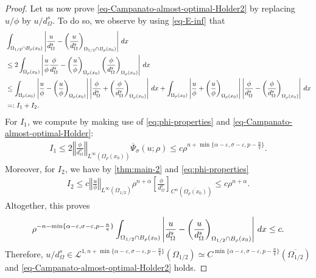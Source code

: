 \documentclass[11pt,reqno]{amsart}
\theoremstyle{plain}
\theoremstyle{definition}
\numberwithin{equation}{section}
\newcommand{\1}{\mathbbm{1}}
\renewcommand{\d}{\textnormal{\,d}}
\begin{document}
\begin{proof}
Let us now prove \eqref{eq-Campanato-almost-optimal-Holder2} by replacing $u/\phi$ by $u/d_{\Omega}^s$. To do so, we observe by using \eqref{eq-E-inf} that
\begin{align}
\label{eq:Campanato-product}
\begin{split}
&\int_{\Omega_{1/2} \cap B_\rho(x_0)} \left| \frac{u}{d^s_{\Omega}} - \left( \frac{u}{d^s_{\Omega}} \right)_{\Omega_{1/2} \cap B_{\rho}(x_0)} \right| \d x \\
&\le 2\int_{\Omega_\rho(x_0)} \left| \frac{u}{\phi}\frac{\phi}{d^s_{\Omega}} - \left( \frac{u}{\phi} \right)_{\Omega_{\rho}(x_0)} \left( \frac{\phi}{d_{\Omega}^s} \right)_{\Omega_{\rho}(x_0)} \right| \d x \\
&\le \int_{\Omega_\rho(x_0)} \left| \frac{u}{\phi} - \left( \frac{u}{\phi} \right)_{\Omega_{\rho}(x_0)} \right| \left| \frac{\phi}{d^s_{\Omega}} + \left( \frac{\phi}{d^s_{\Omega}} \right)_{\Omega_{\rho}(x_0)} \right| \d x + \int_{\Omega_\rho(x_0)} \left| \frac{u}{\phi} + \left( \frac{u}{\phi} \right)_{\Omega_{\rho}(x_0)} \right| \left| \frac{\phi}{d^s_{\Omega}} - \left( \frac{\phi}{d^s_{\Omega}} \right)_{\Omega_{\rho}(x_0)} \right| \d x \\
& =: I_1 + I_2.
\end{split}
\end{align}
For $I_1$, we compute by making use of \eqref{eq:phi-properties} and \eqref{eq-Campanato-almost-optimal-Holder}:
\begin{align*}
I_1 \le 2\left \Vert \frac{\phi}{d^s_{\Omega}} \right\Vert_{L^{\infty}(\Omega_{\rho}(x_0))} \overline{\Psi}_{\sigma}(u;\rho) \le c\rho^{n+\min\{\alpha-\varepsilon,\sigma-\varepsilon, p - \frac{n}{q}\}}.
\end{align*}
Moreover, for $I_2$, we have by \autoref{thm:main-2} and \eqref{eq:phi-properties}
\begin{align*}
I_2 \le c\left \Vert \frac{u}{\phi} \right\Vert_{L^{\infty}(\Omega_{1/2})} \rho^{n+\alpha} \left[ \frac{\phi}{d^s_{\Omega}} \right]_{C^{\alpha}(\overline{\Omega_{\rho}(x_0)})} \le c \rho^{n+\alpha}.
\end{align*}
Altogether, this proves
\begin{align*}
\rho^{-n-\min\{\alpha-\varepsilon,\sigma-\varepsilon, p - \frac{n}{q}\}} \int_{\Omega_{1/2} \cap B_\rho(x_0)} \left| \frac{u}{d^s_{\Omega}} - \left( \frac{u}{d^s_{\Omega}} \right)_{\Omega_{1/2} \cap B_{\rho}(x_0)} \right| \d x  \le c.
\end{align*}
Therefore, $u/d^s_{\Omega} \in \mathcal{L}^{1, n+\min\{\alpha-\varepsilon,\sigma-\varepsilon,p - \frac{n}{q}\}}(\Omega_{1/2}) \simeq C^{\min\{\alpha-\varepsilon,\sigma-\varepsilon,p-\frac{n}{q}\}}(\overline{\Omega_{1/2}})$ and \eqref{eq-Campanato-almost-optimal-Holder2} holds.
\end{proof}
\end{document}
